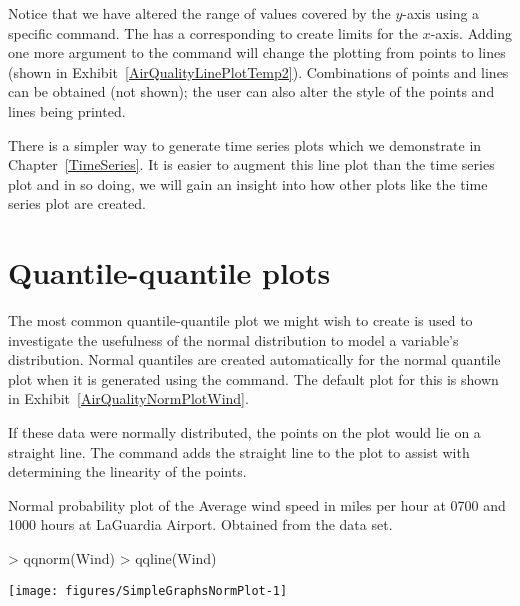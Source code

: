 
Notice that we have altered the range of values covered by the $y$-axis using a specific command. The  has a corresponding  to create limits for the $x$-axis. Adding one more argument to the  command will change the plotting from points to lines (shown in Exhibit~\ref{AirQualityLinePlotTemp2}). Combinations of points and lines can be obtained (not shown); the user can also alter the style of the points and lines being printed.

There is a simpler way to generate time series plots which we demonstrate in Chapter~\ref{TimeSeries}. It is easier to augment this line plot than the time series plot and in so doing, we will gain an insight into how other plots like the time series plot are created.


\section{Quantile-quantile plots}

The most common quantile-quantile plot we might wish to create is used to investigate the usefulness of the normal distribution to model a variable's distribution. Normal quantiles are created automatically for the normal quantile plot when it is generated using the  command. The default plot for this is shown in Exhibit~\ref{AirQualityNormPlotWind}.

If these data were normally distributed, the points on the plot would lie on a straight line. The  command adds the straight line to the plot to assist with determining the linearity of the points.

\begin{exhibit}
\begin{center}
\caption{Normal probability plot of the Average wind speed in miles per hour at 0700 and 1000 hours at LaGuardia Airport. Obtained from the  data set.}
\label{AirQualityNormPlotWind}
\begin{Schunk}
\begin{Sinput}
> qqnorm(Wind)
> qqline(Wind)
\end{Sinput}

\texttt{[image: figures/SimpleGraphsNormPlot-1]} \end{Schunk}
\end{center}
\end{exhibit}

